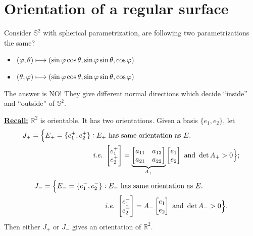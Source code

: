 \section{Orientation of a regular surface}
\begin{question}
    Consider \(\mathbb{S}^2\) with spherical parametrization, are following two
    parametrizations the same?
    \begin{itemize}
        \item \((\varphi,\theta)\longmapsto(\sin\varphi\cos\theta,\sin\varphi\sin\theta,
            \cos\varphi)\)
        \item \((\theta,\varphi)\longmapsto(\sin\varphi\cos\theta,\sin\varphi\sin\theta,
            \cos\varphi)\)
    \end{itemize}
\end{question}

The answer is NO\@! They give different normal directions which decide ``inside'' and
``outside'' of \(\mathbb{S}^2\).

\noindent\underline{\bfseries Recall:} \(\mathbb{R}^2\) is orientable. It has two
orientations. Given a basis \(\{e_1,e_2\}\), let
\begin{align*}
    J_{+}=\Bigl\{E_{+}=\{e_1^+,e_2^+\}&:E_{+}\text{ has same orientation as }E.\\
    &\text{ \emph{i.e.}\ }\begin{bmatrix}
        e_1^+\\ e_2^+
    \end{bmatrix}=\underbrace{\begin{bmatrix}
        a_{11} & a_{12} \\
        a_{21} & a_{22}
    \end{bmatrix}}_{A_{+}}\begin{bmatrix}
        e_1 \\ e_2
    \end{bmatrix}
    \text{ and }\det A_{+}>0\Bigr\};
\end{align*}
\begin{align*}
    J_{-}=\Bigl\{E_{-}=\{e_1^-,e_2^-\}&:E_{-}\text{ has same orientation as }E.\\
    &\text{ \emph{i.e.}\ }\begin{bmatrix}
        e_1^-\\ e_2^-
    \end{bmatrix}
    =A_{-}\begin{bmatrix}
        e_1 \\ e_2
    \end{bmatrix}
    \text{ and }\det A_{-}>0\Bigr\}.
\end{align*}
Then either \(J_{+}\) or \(J_{-}\) gives an orientation of \(\mathbb{R}^2\).


